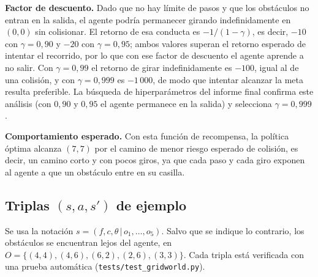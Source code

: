\documentclass[11pt,letterpaper]{article}
\newcommand{\code}[1]{\texttt{#1}}
\begin{document}
\textbf{Factor de descuento.} Dado que no hay límite de pasos y que los obstáculos no entran en la salida, el
agente podría permanecer girando indefinidamente en $(0,0)$ sin colisionar. El retorno de esa conducta es
$-1/(1-\gamma)$, es decir, $-10$ con $\gamma=0{,}90$ y $-20$ con $\gamma=0{,}95$; ambos valores superan el retorno
esperado de intentar el recorrido, por lo que con ese factor de descuento el agente aprende a no salir. Con
$\gamma=0{,}99$ el retorno de girar indefinidamente es $-100$, igual al de una colisión, y con $\gamma=0{,}999$ es
$-1\,000$, de modo que intentar alcanzar la meta resulta preferible. La búsqueda de hiperparámetros del informe
final confirma este análisis (con $0{,}90$ y $0{,}95$ el agente permanece en la salida) y selecciona
$\gamma=0{,}999$.

\textbf{Comportamiento esperado.} Con esta función de recompensa, la política óptima alcanza $(7,7)$ por el
camino de menor riesgo esperado de colisión, es decir, un camino corto y con pocos giros, ya que cada paso y cada
giro exponen al agente a que un obstáculo entre en su casilla.

\subsection{Triplas \texorpdfstring{$(s,a,s')$}{(s,a,s')} de ejemplo}

Se usa la notación $s=(f,c,\theta\,|\,o_1,\dots,o_5)$. Salvo que se indique lo contrario, los obstáculos se
encuentran lejos del agente, en $O=\{(4,4),(4,6),(6,2),(2,6),(3,3)\}$. Cada tripla está verificada con una
prueba automática (\code{tests/test\_gridworld.py}).
\end{document}
